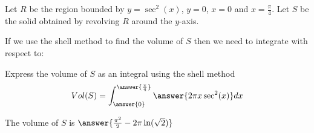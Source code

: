 \documentclass{ximera}
\author{Jason Miller}
\begin{document}
\begin{exercise}
Let $R$ be the region bounded by $y=\sec^{2}(x)$, $y=0$, $x=0$ and $x=\frac{\pi}{4}$. Let $S$ be the solid obtained by revolving $R$ around the $y$-axis. 


If we use the shell method to find the volume of $S$ then we need to integrate with respect to:

 \begin{multipleChoice}
  \end{multipleChoice}

\begin{exercise}
Express the volume of $S$ as an integral using the shell method
\[
Vol(S)=\int_{\answer{0}}^{\answer{\frac{\pi}{4}}} \answer{2\pi x \sec^{2}(x)} dx
\]

The volume of $S$ is $\answer{  \frac{\pi^2}{2}-2\pi\ln(\sqrt{2}) }$


\end{exercise}
\end{exercise}
\end{document}
